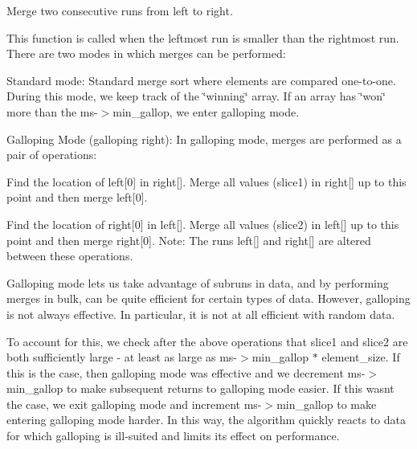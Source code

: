 Merge two consecutive runs from left to right. 

This function is called when the leftmost run is smaller than the rightmost run. There are two modes in which merges can be performed\+:

Standard mode\+: Standard merge sort where elements are compared one-\/to-\/one. During this mode, we keep track of the \char`\"{}winning\char`\"{} array. If an array has \char`\"{}won\char`\"{} more than the ms-\/$>$min\+\_\+gallop, we enter galloping mode.

Galloping Mode (galloping right)\+: In galloping mode, merges are performed as a pair of operations\+:
\begin{DoxyEnumerate}
\item Find the location of left\mbox{[}0\mbox{]} in right\mbox{[}\mbox{]}. Merge all values (slice1) in right\mbox{[}\mbox{]} up to this point and then merge left\mbox{[}0\mbox{]}.
\item Find the location of right\mbox{[}0\mbox{]} in left\mbox{[}\mbox{]}. Merge all values (slice2) in left\mbox{[}\mbox{]} up to this point and then merge right\mbox{[}0\mbox{]}. Note\+: The runs left\mbox{[}\mbox{]} and right\mbox{[}\mbox{]} are altered between these operations.
\end{DoxyEnumerate}

Galloping mode lets us take advantage of subruns in data, and by performing merges in bulk, can be quite efficient for certain types of data. However, galloping is not always effective. In particular, it is not at all efficient with random data.

To account for this, we check after the above operations that slice1 and slice2 are both sufficiently large -\/ at least as large as ms-\/$>$min\+\_\+gallop $\ast$ element\+\_\+size. If this is the case, then galloping mode was effective and we decrement ms-\/$>$min\+\_\+gallop to make subsequent returns to galloping mode easier. If this wasn\textquotesingle{}t the case, we exit galloping mode and increment ms-\/$>$min\+\_\+gallop to make entering galloping mode harder. In this way, the algorithm quickly reacts to data for which galloping is ill-\/suited and limits its effect on performance.


